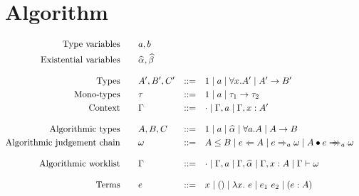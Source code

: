 \section{Algorithm}

$$\begin{aligned}
\text{Type variables}\qquad&a, b\\
\text{Existential variables}\qquad&\a, \b\\[3mm]
\text{Types}\qquad&A', B', C' &::=&\quad 1 \mid a \mid \forall x. A' \mid A'\to B'\\
\text{Mono-types}\qquad&\tau &::=&\quad 1 \mid a \mid \tau_1\to \tau_2\\
\text{Context}\qquad&\Gm &::=&\quad \cdot \mid \Gm, a \mid \Gm, x:A' \color{red} \\[3mm]
\text{Algorithmic types}\qquad&A, B, C &::=&\quad 1 \mid a \mid \a \mid \forall a. A \mid A\to B\\
\text{Algorithmic judgement chain}\qquad&\jg &::=&\quad A \le B \mid e\Lto A \mid e\To_{a} \jg \mid \appInfAlg{A}{e}{a}{\jg}\\[3mm]
\text{Algorithmic worklist}\qquad&\Gm &::=&\quad \cdot \mid \Gm, a \mid \Gm, \a \mid \Gm, x: A \mid \Gm \vdash \jg\\[3mm]
\text{Terms}\qquad&e&::=&\quad x \mid () \mid \lam{x}{e} \mid e_1~e_2 \mid (e:A)
\end{aligned}$$
